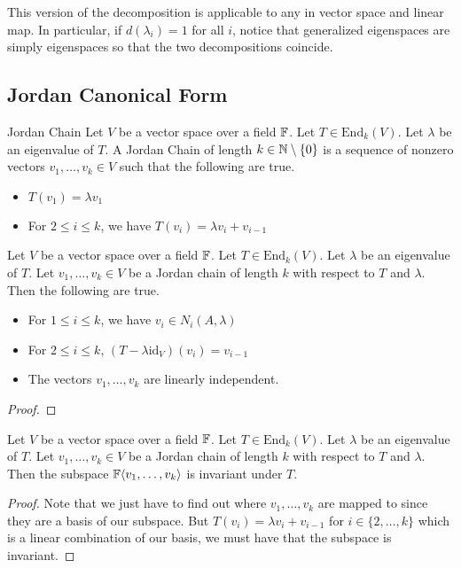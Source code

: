 \documentclass[a4paper]{article}
\begin{document}
This version of the decomposition is applicable to any in vector space and linear map. In particular, if $d(\lambda_i)=1$ for all $i$, notice that generalized eigenspaces are simply eigenspaces so that the two decompositions coincide. 

\subsection{Jordan Canonical Form}
\begin{defn}{Jordan Chain}{} Let $V$ be a vector space over a field $\mathbb{F}$. Let $T\in\text{End}_k(V)$. Let $\lambda$ be an eigenvalue of $T$. A Jordan Chain of length $k\in\mathbb{N}\setminus\{0\}$ is a sequence of nonzero vectors $v_1,\dots,v_k\in V$ such that the following are true. 
\begin{itemize}
\item $T(v_1)=\lambda v_1$
\item For $2\leq i\leq k$, we have $T(v_i)=\lambda v_i+v_{i-1}$
\end{itemize}
\end{defn}

\begin{lmm}{}{} Let $V$ be a vector space over a field $\mathbb{F}$. Let $T\in\text{End}_k(V)$. Let $\lambda$ be an eigenvalue of $T$. Let $v_1,\dots,v_k\in V$ be a Jordan chain of length $k$ with respect to $T$ and $\lambda$. Then the following are true. 
\begin{itemize}
\item For $1\leq i\leq k$, we have $v_i\in N_i(A,\lambda)$
\item For $2\leq i\leq k$, $(T-\lambda\text{id}_V)(v_i)=v_{i-1}$
\item The vectors $v_1,\dots,v_k$ are linearly independent. 
\end{itemize} 
\begin{proof}
\end{proof}
\end{lmm}

\begin{prp}{}{} Let $V$ be a vector space over a field $\mathbb{F}$. Let $T\in\text{End}_k(V)$. Let $\lambda$ be an eigenvalue of $T$. Let $v_1,\dots,v_k\in V$ be a Jordan chain of length $k$ with respect to $T$ and $\lambda$. Then the subspace $\mathbb{F}\langle v_1,\dots,v_k\rangle$ is invariant under $T$. 
\begin{proof}
Note that we just have to find out where $v_1,\dots,v_k$ are mapped to since they are a basis of our subspace. But $T(v_i)=\lambda v_i+v_{i-1}$ for $i\in\{2,\dots,k\}$ which is a linear combination of our basis, we must have that the subspace is invariant. 
\end{proof}
\end{prp}
\end{document}
